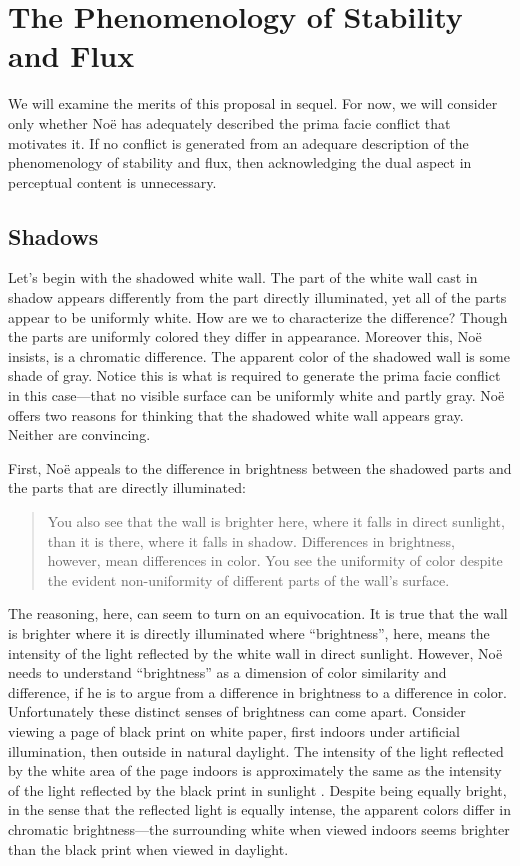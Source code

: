 \documentclass[12pt]{article}
\begin{document}

\section{The Phenomenology of Stability and Flux}\label{sec:stability_and_flux} %

We will examine the merits of this proposal in sequel. For now, we will consider only whether Noë has adequately described the prima facie conflict that motivates it. If no conflict is generated from an adequare description of the phenomenology of stability and flux, then acknowledging the dual aspect in perceptual content is unnecessary.

\subsection{Shadows} %
\label{sub:shadows}

Let's begin with the shadowed white wall. The part of the white wall cast in shadow appears differently from the part directly illuminated, yet all of the parts appear to be uniformly white. How are we to characterize the difference? Though the parts are uniformly colored they differ in appearance. Moreover this, Noë insists, is a chromatic difference. The apparent color of the shadowed wall is some shade of gray. Notice this is what is required to generate the prima facie conflict in this case---that no visible surface can be uniformly white and partly gray. Noë offers two reasons for thinking that the shadowed white wall appears gray. Neither are convincing.

First, Noë appeals to the difference in brightness between the shadowed parts and the parts that are directly illuminated:
	\begin{quote}
		You also see that the wall is brighter here, where it falls in direct sunlight, than it is there, where it falls in shadow. Differences in brightness, however, mean differences in color. You see the uniformity of color despite the evident non-uniformity of different parts of the wall's surface. \citep[127]{Noe:2004fk}
	\end{quote}
The reasoning, here, can seem to turn on an equivocation. It is true that the wall is brighter where it is directly illuminated where ``brightness'', here, means the intensity of the light reflected by the white wall in direct sunlight. However, Noë needs to understand ``brightness'' as a dimension of color similarity and difference, if he is to argue from a difference in brightness to a difference in color. Unfortunately these distinct senses of brightness can come apart. Consider viewing a page of black print on white paper, first indoors under artificial illumination, then outside in natural daylight. The intensity of the light reflected by the white area of the page indoors is approximately the same as the intensity of the light reflected by the black print in sunlight \citep[199]{Peter-K:1996th}. Despite being equally bright, in the sense that the reflected light is equally intense, the apparent colors differ in chromatic brightness---the surrounding white when viewed indoors seems brighter than the black print when viewed in daylight.
\end{document}
